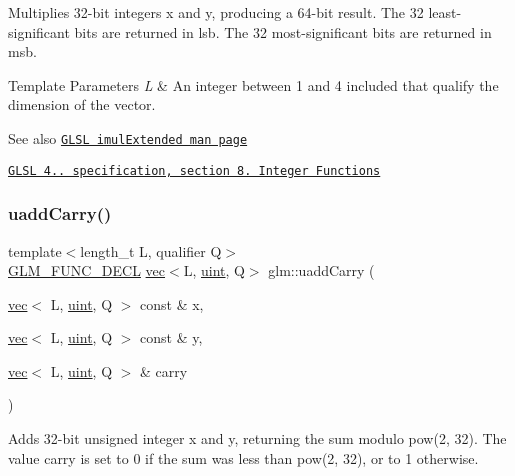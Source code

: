Multiplies 32-\/bit integers x and y, producing a 64-\/bit result. The 32 least-\/significant bits are returned in lsb. The 32 most-\/significant bits are returned in msb.


\begin{DoxyTemplParams}{Template Parameters}
{\em L} & An integer between 1 and 4 included that qualify the dimension of the vector.\\
\hline
\end{DoxyTemplParams}
\begin{DoxySeeAlso}{See also}
\href{http://www.opengl.org/sdk/docs/manglsl/xhtml/imulExtended.xml}{\tt G\+L\+SL imul\+Extended man page} 

\href{http://www.opengl.org/registry/doc/GLSLangSpec.4.20.8.pdf}{\tt G\+L\+SL 4.. specification, section 8. Integer Functions} 
\end{DoxySeeAlso}
\mbox{\label{group__core__func__integer_gaedcec48743632dff6786bcc492074b1b}} 
\subsubsection{\texorpdfstring{uadd\+Carry()}{uaddCarry()}}
{\footnotesize\ttfamily template$<$length\+\_\+t L, qualifier Q$>$ \\
\hyperlink{setup_8hpp_ab2d052de21a70539923e9bcbf6e83a51}{G\+L\+M\+\_\+\+F\+U\+N\+C\+\_\+\+D\+E\+CL} \hyperlink{structglm_1_1vec}{vec}$<$L, \hyperlink{group__core__precision_ga4fd29415871152bfb5abd588334147c8}{uint}, Q$>$ glm\+::uadd\+Carry (\begin{DoxyParamCaption}\item[{\hyperlink{structglm_1_1vec}{vec}$<$ L, \hyperlink{group__core__precision_ga4fd29415871152bfb5abd588334147c8}{uint}, Q $>$ const \&}]{x,  }\item[{\hyperlink{structglm_1_1vec}{vec}$<$ L, \hyperlink{group__core__precision_ga4fd29415871152bfb5abd588334147c8}{uint}, Q $>$ const \&}]{y,  }\item[{\hyperlink{structglm_1_1vec}{vec}$<$ L, \hyperlink{group__core__precision_ga4fd29415871152bfb5abd588334147c8}{uint}, Q $>$ \&}]{carry }\end{DoxyParamCaption})}

Adds 32-\/bit unsigned integer x and y, returning the sum modulo pow(2, 32). The value carry is set to 0 if the sum was less than pow(2, 32), or to 1 otherwise.


